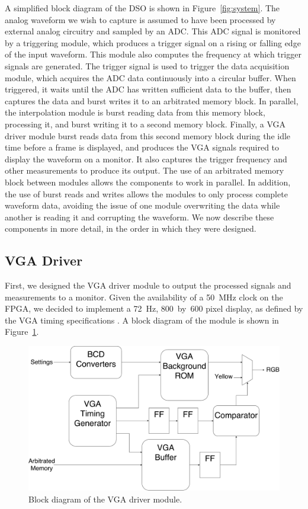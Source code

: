 \documentclass[journal]{IEEEtran}
\begin{document}
A simplified block diagram of the DSO is shown in Figure~\ref{fig:system}. The analog waveform we wish to capture is assumed to have been processed by external analog circuitry and sampled by an ADC. This ADC signal is monitored by a triggering module, which produces a trigger signal on a rising or falling edge of the input waveform. This module also computes the frequency at which trigger signals are generated. The trigger signal is used to trigger the data acquisition module, which acquires the ADC data continuously into a circular buffer. When triggered, it waits until the ADC has written sufficient data to the buffer, then captures the data and burst writes it to an arbitrated memory block. In parallel, the interpolation module is burst reading data from this memory block, processing it, and burst writing it to a second memory block. Finally, a VGA driver module burst reads data from this second memory block during the idle time before a frame is displayed, and produces the VGA signals required to display the waveform on a monitor. It also captures the trigger frequency and other measurements to produce its output. The use of an arbitrated memory block between modules allows the components to work in parallel. In addition, the use of burst reads and writes allows the modules to only process complete waveform data, avoiding the issue of one module overwriting the data while another is reading it and corrupting the waveform. We now describe these components in more detail, in the order in which they were designed.

\subsection{VGA Driver}

First, we designed the VGA driver module to output the processed signals and measurements to a monitor. Given the availability of a 50~MHz clock on the FPGA, we decided to implement a 72~Hz, 800~by~600 pixel display, as defined by the VGA timing specifications \cite{vga_timing}. A block diagram of the module is shown in Figure~\ref{fig:vga_driver}.

\begin{figure}[!htb]
  \centering
  \includegraphics[width=\columnwidth]{diagrams/vga_driver.pdf}
  \caption{Block diagram of the VGA driver module.}
  \label{fig:vga_driver}
\end{figure}
\end{document}
